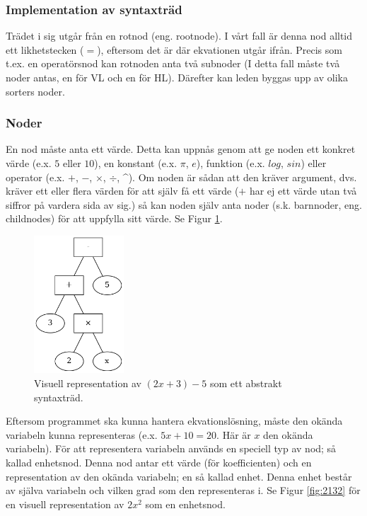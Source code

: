 \documentclass[12pt,a4paper]{article}
\begin{document}
\subsubsection{Implementation av syntaxträd}
Trädet i sig utgår från en rotnod (eng. rootnode). I vårt fall är denna nod alltid ett likhetstecken (\(=\)), eftersom det är där ekvationen utgår ifrån. Precis som t.ex. en operatörsnod kan rotnoden anta två subnoder (I detta fall måste två noder antas, en för VL och en för HL). Därefter kan leden byggas upp av olika sorters noder.
\subsubsection{Noder}
\label{subsubsec:noder}
En nod måste anta ett värde. Detta kan uppnås genom att ge noden ett konkret värde (e.x. \(5\) eller \(10\)), en konstant (e.x. \(\pi\), \(e\)), funktion (e.x. \(log\), \(sin\)) eller operator (e.x. \(+\), \(-\), \(\times\), \(\div\), \string^). Om noden är sådan att den kräver argument, dvs. kräver ett eller flera värden för att själv få ett värde (\(+\) har ej ett värde utan två siffror på vardera sida av sig.) så kan noden själv anta noder (s.k. barnnoder, eng. childnodes) för att uppfylla sitt värde. Se Figur \ref{fig:2131}.
\begin{figure}[h]
  \centering
  \includegraphics[width=0.3\textwidth]{image24}
  \caption{Visuell representation av \((2x + 3) - 5\) som ett abstrakt syntaxträd.}
  \label{fig:2131}
\end{figure}
Eftersom programmet ska kunna hantera ekvationslösning, måste den okända variabeln kunna representeras (e.x. \(5x + 10 = 20\). Här är \(x\) den okända variabeln). För att representera variabeln används en speciell typ av nod; så kallad enhetsnod. Denna nod antar ett värde (för koefficienten) och en representation av den okända variabeln; en så kallad enhet. Denna enhet består av själva variabeln och vilken grad som den representeras i. Se Figur \ref{fig:2132} för en visuell representation av \(2x^{2}\) som en enhetsnod.
\end{document}
